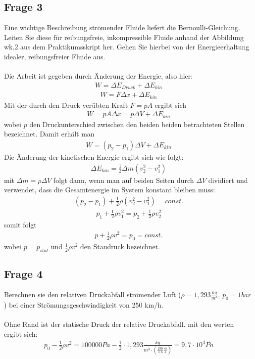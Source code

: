 \documentclass[a4paper,10pt]{scrartcl}
\begin{document}
		\subsection{Frage 3}
			Eine wichtige Beschreibung strömender Fluide liefert die Bernoulli-Gleichung. Leiten Sie diese
			für reibungsfreie, inkompressible Fluide anhand der Abbildung wk.2 aus dem Praktikumsskript her. Gehen Sie hierbei von der Energieerhaltung idealer, reibungsfreier Fluide aus.\\
			\\
			Die Arbeit ist gegeben durch Änderung der Energie, also hier:
			\begin{align*}
			W=\Delta E_{Druck}+\Delta E_{kin}
			\end{align*}
			\begin{align*}
			W=F\Delta x + \Delta E_{kin}
			\end{align*}
			Mit der durch den Druck verübten Kraft \(F=pA\) ergibt sich
			\begin{align*}
			W=pA\Delta x=p\Delta V +\Delta E_{kin}
			\end{align*}
			wobei \(p\) den Druckunterschied zwischen den beiden beiden betrachteten Stellen bezeichnet. Damit erhält man
			\begin{align*}
			W=(p_{2}-p_{1})\Delta V +\Delta E_{kin}
			\end{align*}
			Die Änderung der kinetischen Energie ergibt sich wie folgt:
			\begin{align*}
			\Delta E_{kin}=\frac{1}{2}\Delta m(v_{2}^{2}-v_{1}^{2})
			\end{align*}
			mit \(\Delta m=\rho \Delta V\) folgt dann, wenn man auf beiden Seiten durch \(\Delta V\) dividiert und verwendet, dass die Gesamtenergie im System konstant bleiben muss:
			\begin{align*}
			(p_{2}-p_{1})+\frac{1}{2}\rho (v_{2}^{2}-v_{1}^{2})=const.
			\end{align*}
			\begin{align*}
			p_{1}+\frac{1}{2}\rho v_{1}^{2}=p_{2}+\frac{1}{2}\rho v_{2}^{2}
			\end{align*}
			somit folgt
			\begin{align*}
			p+\frac{1}{2}\rho v^{2}=p_{0}=const.
			\end{align*}
			wobei \(p=p_{stat}\) und \(\frac{1}{2}\rho v^{2}\) den Staudruck bezeichnet.
			
		\subsection{Frage 4}
			Berechnen sie den relativen Druckabfall strömender Luft (\(\rho=1,293\frac{kg}{m^{3}}\), \(p_{0}=1bar\)) bei
			einer Strömungsgeschwindigkeit von 250 km/h.\\
			\\
			Ohne Rand ist der statische Druck der relative Druckabfall. mit den werten ergibt sich:
			\begin{align*}
			p_{0}-\frac{1}{2}\rho v^{2}=100000Pa-\frac{1}{2}\cdot 1,293\frac{kg}{m^{3}\cdot (\frac{250}{3,6}\frac{m}{s})}=9,7\cdot 10^{4}Pa
			\end{align*}
			
\end{document}
